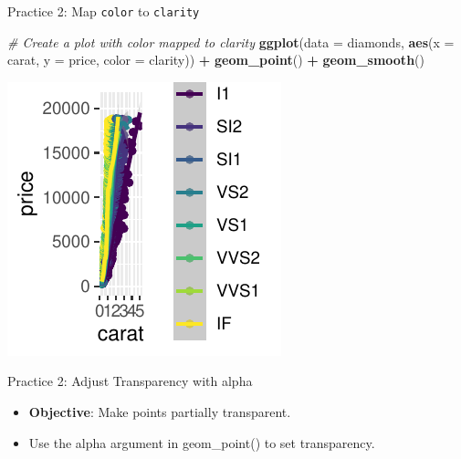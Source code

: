 \documentclass[
  ignorenonframetext,
]{beamer}
\newenvironment{Shaded}{\begin{snugshade}}{\end{snugshade}}
\newcommand{\AttributeTok}[1]{\textcolor[rgb]{0.13,0.29,0.53}{#1}}
\newcommand{\CommentTok}[1]{\textcolor[rgb]{0.56,0.35,0.01}{\textit{#1}}}
\newcommand{\FunctionTok}[1]{\textcolor[rgb]{0.13,0.29,0.53}{\textbf{#1}}}
\newcommand{\NormalTok}[1]{#1}
\newcommand{\SpecialCharTok}[1]{\textcolor[rgb]{0.81,0.36,0.00}{\textbf{#1}}}
\providecommand{\tightlist}{%
  \setlength{\itemsep}{0pt}\setlength{\parskip}{0pt}}
\begin{document}
\begin{frame}[fragile]{Practice 2: Map \texttt{color} to
\texttt{clarity}}
\label{practice-2-map-color-to-clarity-1}

\begin{Shaded}
\begin{Highlighting}[]
\CommentTok{\# Create a plot with color mapped to clarity}
\FunctionTok{ggplot}\NormalTok{(}\AttributeTok{data =}\NormalTok{ diamonds, }\FunctionTok{aes}\NormalTok{(}\AttributeTok{x =}\NormalTok{ carat, }\AttributeTok{y =}\NormalTok{ price, }\AttributeTok{color =}\NormalTok{ clarity)) }\SpecialCharTok{+}
    \FunctionTok{geom\_point}\NormalTok{() }\SpecialCharTok{+} \FunctionTok{geom\_smooth}\NormalTok{()}
\end{Highlighting}
\end{Shaded}

\begin{center}\includegraphics[width=0.5\linewidth]{Figs/unnamed-chunk-5-1} \end{center}
\end{frame}

\begin{frame}{Practice 2: Adjust Transparency with alpha}
\label{practice-2-adjust-transparency-with-alpha}
\begin{itemize}
\tightlist
\item
  \textbf{Objective}: Make points partially transparent.
\item
  Use the alpha argument in geom\_point() to set transparency.
\end{itemize}
\end{frame}
\end{document}
